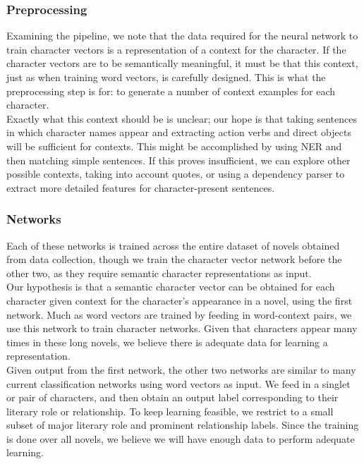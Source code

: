 \documentclass[12pt]{article}
\begin{document}
\subsubsection{Preprocessing}
    Examining the pipeline, we note that the data required for the neural network to train character vectors is a representation of a context for the character. If the character vectors are to be semantically meaningful, it must be that this context, just as when training word vectors, is carefully designed. This is what the preprocessing step is for: to generate a number of context examples for each character. \\

    Exactly what this context should be is unclear; our hope is that taking sentences in which character names appear and extracting action verbs and direct objects will be sufficient for contexts. This might be accomplished by using NER and then matching simple sentences. If this proves insufficient, we can explore other possible contexts, taking into account quotes, or using a dependency parser to extract more detailed features for character-present sentences.

\subsubsection{Networks}
    Each of these networks is trained across the entire dataset of novels obtained from data collection, though we train the character vector network before the other two, as they require semantic character representations as input.  \\

    Our hypothesis is that a semantic character vector can be obtained for each character given context for the character's appearance in a novel, using the first network. Much as word vectors are trained by feeding in word-context pairs, we use this network to train character networks. Given that characters appear many times in these long novels, we believe there is adequate data for learning a representation. \\

    Given output from the first network, the other two networks are similar to many current classification networks using word vectors as input. We feed in a singlet or pair of characters, and then obtain an output label corresponding to their literary role or relationship. To keep learning feasible, we restrict to a small subset of major literary role and prominent relationship labels. Since the training is done over all novels, we believe we will have enough data to perform adequate learning. \\
\end{document}
